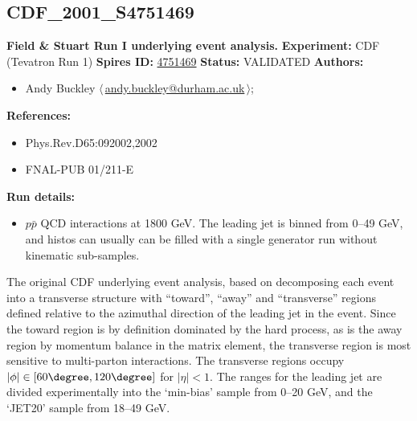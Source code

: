 \subsection[CDF\_2001\_S4751469]{CDF\_2001\_S4751469\,\cite{Affolder:2001xt}}
\textbf{Field \& Stuart Run I underlying event analysis.}\newline
\textbf{Experiment:} CDF (Tevatron Run 1) \newline
\textbf{Spires ID:} \href{http://www.slac.stanford.edu/spires/find/hep/www?rawcmd=key+4751469}{4751469}\newline
\textbf{Status:} VALIDATED\newline
\textbf{Authors:}
\begin{itemize}
  \item Andy Buckley $\langle\,$\href{mailto:andy.buckley@durham.ac.uk}{andy.buckley@durham.ac.uk}$\,\rangle$;
\end{itemize}
\textbf{References:}
\begin{itemize}
  \item Phys.Rev.D65:092002,2002
  \item FNAL-PUB 01/211-E
\end{itemize}
\textbf{Run details:}
\begin{itemize}

  \item $p\bar{p}$ QCD interactions at 1800 GeV. The leading jet is binned from 0--49 GeV, and histos can usually can be filled with a single generator run without kinematic sub-samples.\end{itemize}

\noindent The original CDF underlying event analysis, based on decomposing each event into a transverse structure with ``toward'', ``away'' and ``transverse'' regions defined relative to the azimuthal direction of the leading jet in the event. Since the toward region is by definition dominated by the hard process, as is the away region by momentum balance in the matrix element, the transverse region is most sensitive to multi-parton interactions. The transverse regions occupy $|\phi| \in [60\degree, 120\degree]$ for $|\eta| < 1$. The \pT ranges for the leading jet are divided experimentally into the `min-bias' sample from 0--20 GeV, and the `JET20' sample from 18--49 GeV.

\clearpage


\clearpage


